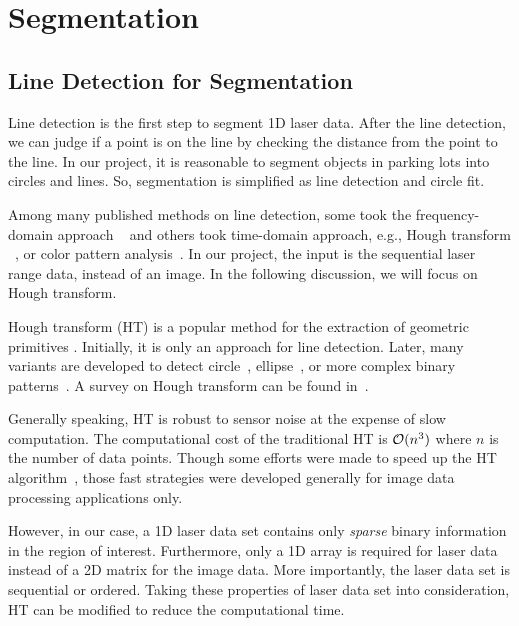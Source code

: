 \documentclass[twocolumn]{IEEEtran}
\begin{document}
\nopagebreak
\section{Segmentation}
\label{sec2}


\subsection{Line Detection for Segmentation}
\label{sec21}

Line detection is the first step to segment 1D laser data. After the line detection, we can judge if a point is on the line by checking the distance from the point to the line. In our project, it is reasonable to segment objects in parking lots into circles and lines. So, segmentation is simplified as line detection and circle fit. 

Among many published methods on line detection, some took the frequency-domain approach ~\cite{HuaLineFitting} and others took time-domain approach, e.g., Hough transform ~\cite{HoughSurvey}, or color pattern analysis~\cite{Jan00model}. In our project, the input is the sequential laser range data, instead of an image. In the following discussion, we will focus on Hough transform.

Hough transform (HT) is a popular method for the extraction of geometric primitives \cite{HoughSurvey,Atherton99CHT}. Initially, it is only an approach for line detection. Later, many variants are developed to detect circle~\cite{Atherton99CHT}, ellipse~\cite{guil97lower}, or more complex binary patterns~\cite{guil96new}. A survey on Hough transform can be found in~\cite{HoughSurvey}. 

Generally speaking, HT is robust to sensor noise at the expense of slow computation. The computational cost of the traditional HT is ${\cal O}(n^3)$ where $n$ is the number of data points. Though some efforts were made to speed up the HT algorithm~\cite{matas98progressive}, those fast strategies were developed generally for image data processing applications only. 

However, in our case, a 1D laser data set contains only {\em sparse}  binary information in the region of interest. Furthermore,  only a 1D array is required for laser data instead of a 2D  matrix for the image data. More importantly, the laser data set is  sequential or ordered. Taking these properties of laser data set into consideration, HT can be modified to reduce the computational time. 
\end{document}
